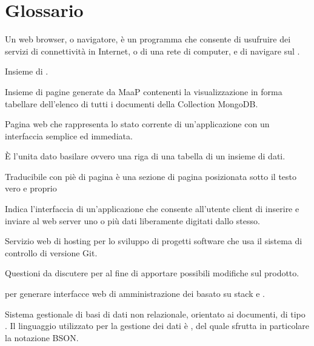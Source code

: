\clearpage
\section{Glossario}

	Un web browser, o navigatore, è un programma che consente di usufruire dei servizi di connettività in Internet, o di una rete di computer, e di navigare sul .


	Insieme di .

	Insieme di pagine generate da MaaP contenenti la visualizzazione in forma tabellare dell'elenco di tutti i documenti della Collection MongoDB.


	Pagina web che rappresenta lo stato corrente di un'applicazione con un interfaccia semplice ed immediata.

	\`E l'unita dato basilare ovvero una riga di una tabella di un insieme di dati.


	Traducibile con piè di pagina è una sezione di pagina posizionata sotto il testo vero e proprio

	Indica l'interfaccia di un'applicazione che consente all'utente client di inserire e inviare al web server uno o più dati liberamente digitati dallo stesso.


	Servizio web di hosting per lo sviluppo di progetti software che usa il sistema di controllo di versione Git.


	Questioni da discutere per al fine di apportare possibili modifiche sul prodotto.
	

	 per generare interfacce web di amministrazione dei  basato su stack  e .


	Sistema gestionale di basi di dati non relazionale, orientato ai documenti, di tipo . Il linguaggio utilizzato per la gestione dei dati è , del quale sfrutta in particolare la notazione BSON.

